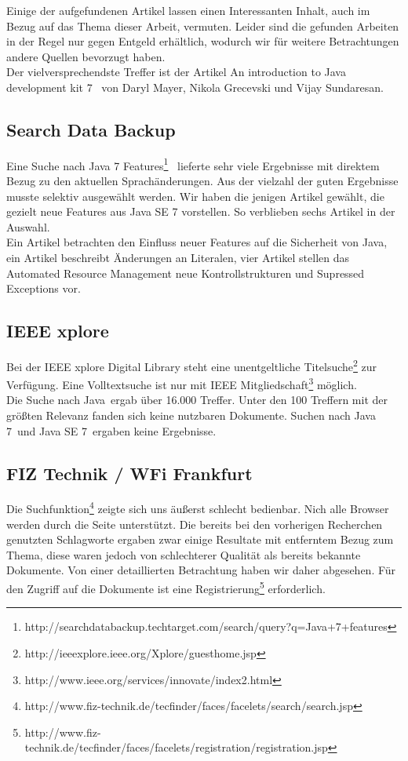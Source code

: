 Einige der aufgefundenen Artikel lassen einen Interessanten Inhalt, auch im Bezug auf das Thema dieser Arbeit, vermuten. Leider sind die gefunden Arbeiten in der Regel nur gegen Entgeld erhältlich, wodurch wir für weitere Betrachtungen andere Quellen bevorzugt haben.\\

Der vielversprechendste Treffer ist der Artikel \glqq An introduction to Java development kit 7 \grqq\cite{acmJava7} ~von Daryl Mayer, Nikola Grecevski und Vijay Sundaresan.

\subsection{Search Data Backup}
Eine Suche nach \glqq Java 7 Features\grqq\footnote{http://searchdatabackup.techtarget.com/search/query?q=Java+7+features} ~lieferte sehr viele Ergebnisse mit direktem Bezug zu den aktuellen Sprachänderungen. Aus der vielzahl der guten Ergebnisse musste selektiv ausgewählt werden. Wir haben die jenigen Artikel gewählt, die gezielt neue Features aus Java SE 7 vorstellen. So verblieben sechs Artikel in der Auswahl.\\

Ein Artikel\cite{sbJ7ImproveSec} betrachten den Einfluss neuer Features auf die Sicherheit von Java, ein Artikel\cite{sbJ7literals} beschreibt Änderungen an Literalen, vier Artikel stellen das Automated Resource Management\cite{sbJ7resources}\cite{sbJ7coin} neue Kontrollstrukturen\cite{sbJ7switch} und Supressed Exceptions\cite{sbJ7exeptions} vor.

\subsection{IEEE xplore}
Bei der IEEE xplore Digital Library steht eine unentgeltliche Titelsuche\footnote{http://ieeexplore.ieee.org/Xplore/guesthome.jsp} zur Verfügung. Eine Volltextsuche ist nur mit IEEE Mitgliedschaft\footnote{http://www.ieee.org/services/innovate/index2.html} möglich.\\

Die Suche nach \glqq Java\grqq ~ergab über 16.000 Treffer. Unter den 100 Treffern mit der größten Relevanz fanden sich keine nutzbaren Dokumente. Suchen nach \glqq Java 7\grqq ~und \glqq Java SE 7\grqq ~ergaben keine Ergebnisse.

\subsection{FIZ Technik / WFi Frankfurt}
Die Suchfunktion\footnote{http://www.fiz-technik.de/tecfinder/faces/facelets/search/search.jsp} zeigte sich uns äußerst schlecht bedienbar. Nich alle Browser werden durch die Seite unterstützt. Die bereits bei den vorherigen Recherchen genutzten Schlagworte ergaben zwar einige Resultate mit entferntem Bezug zum Thema, diese waren jedoch von schlechterer Qualität als bereits bekannte Dokumente. Von einer detaillierten Betrachtung haben wir daher abgesehen.
Für den Zugriff auf die Dokumente ist eine Registrierung\footnote{http://www.fiz-technik.de/tecfinder/faces/facelets/registration/registration.jsp} erforderlich.

